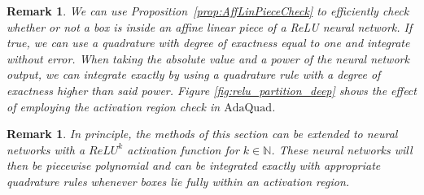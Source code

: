 \documentclass[a4paper, 11pt]{article}
\newcommand{\N}{\mathbb{N}}
\newtheorem{remark}[theorem]{Remark}
\begin{document}
	\begin{remark}\label{rem:ExactIntegration}
		We can use Proposition~\ref{prop:AffLinPieceCheck} to efficiently check whether or not a box is inside an affine linear piece of a ReLU neural network. If true, we can use a quadrature with degree of exactness equal to one and integrate without error. When taking the absolute value and a power of the neural network output, we can integrate exactly by using a quadrature rule with a degree of exactness higher than said power. Figure \ref{fig:relu_partition_deep} shows the effect of employing the activation region check in $\mathrm{AdaQuad}$. 
	\end{remark}
	\begin{remark}\label{rem:higher-orderReLU}
		In principle, the methods of this section can be extended to neural networks with a $ReLU^k$ activation function for $k \in \N$. These neural networks will then be piecewise polynomial and can be integrated exactly with appropriate quadrature rules whenever boxes lie fully within an activation region.
	\end{remark}
	
	
	
	
\end{document}
